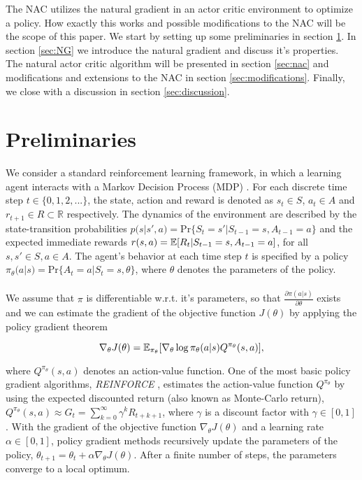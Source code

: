 The NAC utilizes the natural gradient in an actor critic environment to optimize a policy. How exactly this works and possible modifications to the NAC will be the scope of this paper. We start by setting up some preliminaries in section \ref{sec:preliminaries}. In section \ref{sec:NG} we introduce the natural gradient and discuss it's properties. The natural actor critic algorithm will be presented in section \ref{sec:nac} and modifications and extensions to the NAC in section \ref{sec:modifications}. Finally, we close with a discussion in section \ref{sec:discussion}.


\section{Preliminaries}
\label{sec:preliminaries}

We consider a standard reinforcement learning framework, in which a learning agent interacts with a Markov Decision Process (MDP) \citep{howard1960dynamic, sutton2018reinforcement}. For each discrete time step $t \in \{0,1,2,...\}$, the state, action and reward is denoted as $s_t \in \mathit{S}$, $a_t \in A$ and $r_{t+1} \in \mathit{R} \subset \mathbb{R}$ respectively. The dynamics of the environment are described by the state-transition probabilities $p(s|s', a) = \text{Pr}\{S_t = s' | S_{t-1} = s, A_{t-1} = a\}$ and the expected immediate rewards $r(s, a) = \operatorname{\mathbb{E}}[R_t | S_{t-1} = s, A_{t-1} = a]$, for all $s, s' \in S, a \in A$. The agent's behavior at each time step $t$ is specified by a policy $\pi_{\theta}(a|s) = \text{Pr}\{A_t = a | S_{t} = s, \theta\}$, where $\theta$ denotes the parameters of the policy. 
\\\\
We assume that $\pi$ is differentiable w.r.t. it's parameters, so that $\tfrac{\partial\pi(a|s)}{\partial \theta}$ exists and we can estimate the gradient of the objective function $J(\theta)$ by applying the policy gradient theorem \citep{sutton2000policy}

\begin{equation}
\label{equ:policygradienttheorem}
\nabla_{\theta}J(\theta)=\operatorname{\mathbb{E}}_{\pi_{\theta}}[\nabla_{\theta}\log\pi_{\theta}(a|s) Q^{\pi_{\theta}}(s, a)],
\end{equation}

\noindent where $Q^{\pi_{\theta}}(s, a)$ denotes an action-value function. One of the most basic policy gradient algorithms, \textit{REINFORCE} \citep{williams1992simple}, estimates the action-value function $Q^{\pi_{\theta}}$ by using the expected discounted return (also known as Monte-Carlo return), \(Q^{\pi_\theta}(s, a) \approx \mathit{G}_t = \sum_{k=0}^{\infty}\gamma^k R_{t+k+1}\),
where $\gamma$ is a discount factor with $\gamma \in [0, 1]$. With the gradient of the objective function $\nabla_{\theta}J(\theta)$ and a learning rate $\alpha \in \left[0,1\right]$, policy gradient methods recursively update the parameters of the policy, $\theta_{t+1} = \theta_t + \alpha \nabla_{\theta} J(\theta)$. After a finite number of steps, the parameters converge to a local optimum. 

